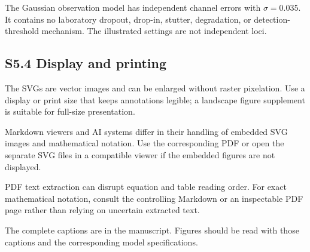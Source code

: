 \documentclass[
]{article}
\begin{document}
The Gaussian observation model has independent channel errors with
\(\sigma=0.035\). It contains no laboratory dropout, drop-in, stutter,
degradation, or detection-threshold mechanism. The illustrated settings
are not independent loci.

\subsection{S5.4 Display and printing}\label{s5.4-display-and-printing}

The SVGs are vector images and can be enlarged without raster
pixelation. Use a display or print size that keeps annotations legible;
a landscape figure supplement is suitable for full-size presentation.

Markdown viewers and AI systems differ in their handling of embedded SVG
images and mathematical notation. Use the corresponding PDF or open the
separate SVG files in a compatible viewer if the embedded figures are
not displayed.

PDF text extraction can disrupt equation and table reading order. For
exact mathematical notation, consult the controlling Markdown or an
inspectable PDF page rather than relying on uncertain extracted text.

The complete captions are in the manuscript. Figures should be read with
those captions and the corresponding model specifications.
\end{document}
